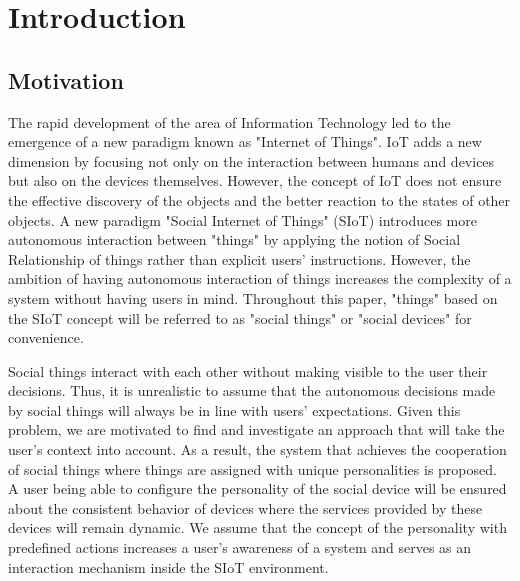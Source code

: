 \chapter{Introduction}
\label{ch:introduction}

\section{Motivation}
\label{sec:motivation}
The rapid development of the area of Information Technology led to the
emergence of a new paradigm known as "Internet of Things".
IoT adds a new dimension by focusing not only on the interaction between
humans and devices but also on the devices themselves.
However, the concept of IoT does not ensure the effective discovery of the
objects and the better reaction to the states of other objects.
A new paradigm "Social Internet of Things" (SIoT) introduces more autonomous
interaction between "things" by applying the notion of Social Relationship of
things rather than explicit users' instructions.
However, the ambition of having autonomous interaction of things increases
the complexity of a system without having users in mind.
Throughout this paper, "things" based on the SIoT concept will be referred to as
"social things" or "social devices" for convenience.

Social things interact with each other without making visible to the user their decisions.
Thus, it is unrealistic to assume that the autonomous decisions made by
social things will always be in line with users' expectations.
Given this problem, we are motivated to find and investigate an approach
that will take the user's context into account.
As a result, the system that achieves the cooperation of social things
where things are assigned with unique personalities is proposed.
A user being able to configure the personality of the social device will be ensured about
the consistent behavior of devices where the services provided by these devices will remain dynamic.
We assume that the concept of the personality with predefined actions increases a user's
awareness of a system and serves as an interaction mechanism inside the SIoT environment.

